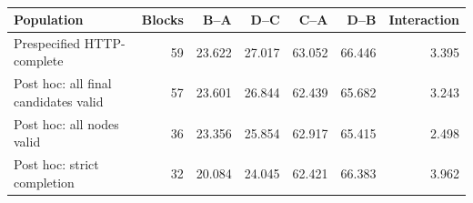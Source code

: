 \begin{table}[!t]
\centering\ifshowrevisions\color{blue}\else\color{black}\fi\footnotesize
\caption{}
\label{tab:matched-sensitivity}
\begin{tabular}{lrrrrrr}
\toprule Population & Blocks & B--A & D--C & C--A & D--B & Interaction \\
\midrule
Prespecified HTTP-complete & 59 & 23.622 & 27.017 & 63.052 & 66.446 & 3.395 \\
Post hoc: all final candidates valid & 57 & 23.601 & 26.844 & 62.439 & 65.682 & 3.243 \\
Post hoc: all nodes valid & 36 & 23.356 & 25.854 & 62.917 & 65.415 & 2.498 \\
Post hoc: strict completion & 32 & 20.084 & 24.045 & 62.421 & 66.383 & 3.962 \\
\bottomrule
\end{tabular}
\end{table}
